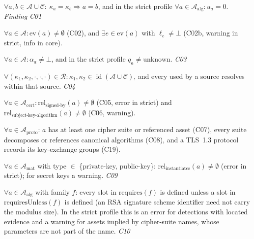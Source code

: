\documentclass[11pt,a4paper]{article}
\newcommand{\Assets}{\mathcal{A}}
\newcommand{\Comps}{\mathcal{C}}
\newcommand{\Rels}{\mathcal{R}}
\newcommand{\id}{\operatorname{id}}
\theoremstyle{definition}
\theoremstyle{plain}
\begin{document}
\setcounter{constraint}{0}
\begin{constraint}[Identity]\label{c:identity}
$\forall a,b \in \Assets \cup \Comps:\ \kappa_a = \kappa_b \Rightarrow a = b$, and in the strict
profile $\forall a \in \Assets_{\mathrm{alg}}: u_a = 0$. \hfill\emph{Finding C01}
\end{constraint}
\setcounter{constraint}{1}
\begin{constraint}
$\forall a \in \Assets: \mathrm{ev}(a) \neq \emptyset$ (C02), and $\exists e \in \mathrm{ev}(a)$
with $\ell_e \ne \bot$ (C02b, warning in strict, info in core).
\end{constraint}
\setcounter{constraint}{2}
\begin{constraint}
$\forall a \in \Assets: \alpha_a \ne \bot$, and in the strict profile $q_a \ne \text{unknown}$. \hfill\emph{C03}
\end{constraint}
\setcounter{constraint}{3}
\begin{constraint}
$\forall (\kappa_1,\kappa_2,\cdot,\cdot,\cdot) \in \Rels: \kappa_1,\kappa_2 \in \id(\Assets \cup \Comps)$,
and every  used by a source resolves within that source. \hfill\emph{C04}
\end{constraint}
\setcounter{constraint}{4}
\begin{constraint}
$\forall a \in \Assets_{\mathrm{cert}}: \mathrm{rel}_{\text{signed-by}}(a) \neq \emptyset$ (C05,
error in strict) and $\mathrm{rel}_{\text{subject-key-algorithm}}(a) \ne \emptyset$ (C06, warning).
\end{constraint}
\setcounter{constraint}{6}
\begin{constraint}
$\forall a \in \Assets_{\mathrm{proto}}$: $a$ has at least one cipher suite or referenced asset
(C07), every suite decomposes or references canonical algorithms (C08), and a TLS~1.3 protocol
records its key-exchange groups (C19).
\end{constraint}
\setcounter{constraint}{8}
\begin{constraint}
$\forall a \in \Assets_{\mathrm{mat}}$ with type $\in$ \{private-key, public-key\}:
$\mathrm{rel}_{\text{instantiates}}(a) \ne \emptyset$ (error in strict); for secret keys a
warning. \hfill\emph{C09}
\end{constraint}
\setcounter{constraint}{9}
\begin{constraint}[Parameterisation]\label{c:param}
$\forall a \in \Assets_{\mathrm{alg}}$ with family $f$: every slot in $\mathrm{requires}(f)$
is defined unless a slot in $\mathrm{requiresUnless}(f)$ is defined (an RSA signature scheme
identifier need not carry the modulus size). In the strict profile this is an error for
detections with located evidence and a warning for assets implied by cipher-suite names, whose
parameters are not part of the name. \hfill\emph{C10}
\end{constraint}
\end{document}
